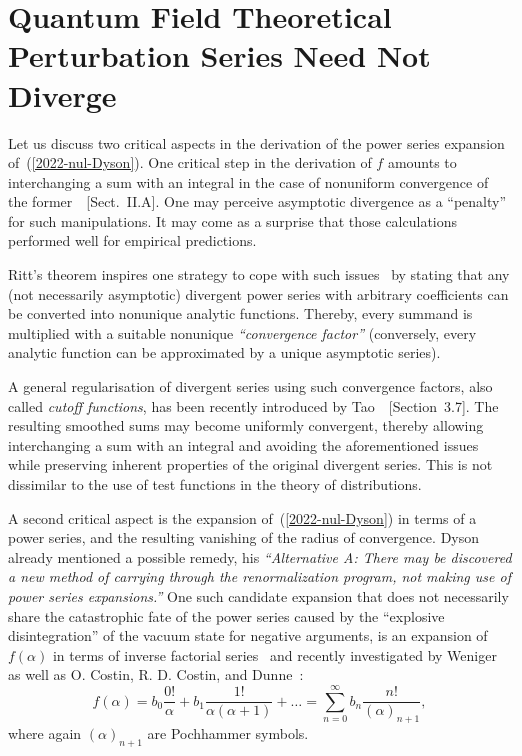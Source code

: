 \documentclass[axioms,article,accept,oneauthor,pdftex]{Definitions/mdpi}
\begin{document}
\section{Quantum Field Theoretical Perturbation Series Need Not Diverge}

Let us discuss two critical aspects in the derivation of the power series expansion of~(\ref{2022-nul-Dyson}).
One critical step in the derivation of $f$
amounts to interchanging a sum with an integral
in the case of nonuniform convergence of the former~\cite{PhysRevD.57.1144}~[Sect.~II.A].
One may perceive asymptotic divergence as a ``penalty'' for such manipulations.
It may come as a surprise that those calculations performed well for empirical predictions.

Ritt's theorem inspires one strategy to cope with such issues~\cite{Pittnauer-73,Remmert-1991-tocf} by
stating that any (not necessarily asymptotic) divergent power series with arbitrary coefficients can
be converted into nonunique analytic functions. Thereby, every summand is
multiplied with a suitable nonunique {\em ``convergence factor''}
(conversely, every analytic function can be approximated by a unique asymptotic series).

A general regularisation
of divergent series using such convergence factors,
also called {\em cutoff functions}, has been recently introduced by
Tao~\cite{Tao-2013}~[Section~3.7].
The resulting smoothed sums may become uniformly convergent, thereby
allowing interchanging a sum with an integral
and avoiding the aforementioned issues while preserving
inherent properties of the original divergent series.
This is not dissimilar to the use of test functions in the theory of distributions.


A second critical aspect is the expansion of~(\ref{2022-nul-Dyson}) in terms of a power series, and the resulting vanishing of the radius of convergence.
Dyson already mentioned a possible remedy, his
{\em ``Alternative A: There may be discovered a new method
of carrying through the renormalization program, not making use of power series expansions.''}
One such candidate expansion that does not necessarily share the catastrophic fate of the power series caused by the ``explosive disintegration''
of the vacuum state for negative arguments, is an expansion of $f(\alpha )$ in terms of inverse factorial series~\cite{Watson1912,Doetsch1972}
and recently investigated by Weniger~\cite{Weniger2010} as well as O. Costin, R. D. Costin, and Dunne~\cite{Costin2016Aug,Costin_Dunne_2017}:
\begin{equation}
f(\alpha)
=
b_0 \frac{0!}{\alpha}
+
b_1 \frac{1!}{\alpha(\alpha +1)}
+
\ldots
= \sum_{n=0}^\infty b_n \frac{n!}{(\alpha)_{n+1}}
,
\label{2022-nul-ifs}
\end{equation}
where again $\left(\alpha\right)_{n+1}$ are Pochhammer symbols.
\end{document}
